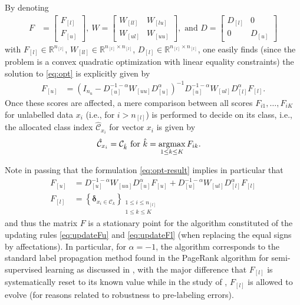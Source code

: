 \documentclass[twoside,11pt]{article}
\DeclareMathOperator{\argmax}{{\rm argmax}}
\begin{document}
By denoting
\begin{align*}
	F &= \begin{bmatrix}F_{[l]} \\F_{[u]}\end{bmatrix},~W=\begin{bmatrix}W_{[ll]} & W_{[lu]}\\W_{[ul]} & W_{[uu]}\end{bmatrix},\text{ and }D=\begin{bmatrix}D_{[l]} & 0\\0 & D_{[u]}\end{bmatrix}
\end{align*}
with $F_{[l]}\in\mathbb{R}^{n_{[l]}}$, $W_{[ll]}\in\mathbb{R}^{n_{[l]}\times n_{[l]}}$, $D_{[l]}\in\mathbb{R}^{n_{[l]}\times n_{[l]}}$, one easily finds (since the problem is a convex quadratic optimization with linear equality constraints) the solution to \eqref{eq:opt} is explicitly given by
\begin{align}
\label{eq:opt-result}
F_{[u]}&=\left(I_{n_{u}}-D_{[u]}^{-1-\alpha}W_{[uu]}D_{[u]}^{\alpha}\right)^{-1}D_{[u]}^{-1-\alpha}W_{[ul]}D_{[l]}^{\alpha}F_{[l]}.
\end{align}
Once these scores are affected, a mere comparison between all scores $F_{i1},\ldots,F_{iK}$ for unlabelled data $x_i$ (i.e., for $i>n_{[l]}$) is performed to decide on its class, i.e., the allocated class index $\hat{\mathcal C}_{x_i}$ for vector $x_i$ is given by
\begin{align*}
	\hat{\mathcal C}_{x_i} &= \mathcal C_{\hat k}\text{ for }\hat k=\argmax_{1\leq k\leq K} F_{ik}.
\end{align*}

\medskip

Note in passing that the formulation \eqref{eq:opt-result} implies in particular that
\begin{align}
	\label{eq:updateFu}
	F_{[u]} &= D_{[u]}^{-1-\alpha}W_{[uu]}D_{[u]}^{\alpha} F_{[u]} + D_{[u]}^{-1-\alpha}W_{[ul]}D_{[l]}^{\alpha}F_{[l]} \\
	\label{eq:updateFl}
	F_{[l]} &= \left\{ {\bm \delta}_{x_i\in\mathcal C_k} \right\}_{\substack{1\leq i\leq n_{[l]} \\ 1\leq k\leq K}}
\end{align}
and thus the matrix $F$ is a stationary point for the algorithm constituted of the updating rules \eqref{eq:updateFu} and \eqref{eq:updateFl} (when replacing the equal signs by affectations). In particular, for $\alpha=-1$, the algorithm corresponds to the standard label propagation method found in the PageRank algorithm for semi-supervised learning as discussed in \citet{avrachenkov2011generalized}, with the major difference that $F_{[l]}$ is systematically reset to its known value while in the study of \citet{avrachenkov2011generalized}, $F_{[l]}$ is allowed to evolve (for reasons related to robustness to pre-labeling errors).
\end{document}
